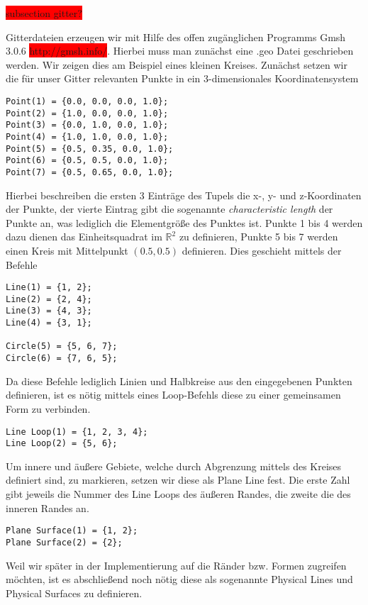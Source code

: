 \documentclass[bibliography=totoc,12pt,a4paper]{scrartcl}
\theoremstyle{exampstyle}
\numberwithin{equation}{section}
\begin{document}
\colorbox{red}{subsection gitter?}

Gitterdateien erzeugen wir mit Hilfe des offen zugänglichen Programms \textsf{Gmsh 3.0.6} \colorbox{red}{http://gmsh.info/}. Hierbei muss man zunächst eine \textsf{.geo} Datei geschrieben werden. Wir zeigen dies am Beispiel eines kleinen Kreises.
Zunächst setzen wir die für unser Gitter relevanten Punkte in ein 3-dimensionales Koordinatensystem

\begin{lstlisting}
Point(1) = {0.0, 0.0, 0.0, 1.0};
Point(2) = {1.0, 0.0, 0.0, 1.0};
Point(3) = {0.0, 1.0, 0.0, 1.0};
Point(4) = {1.0, 1.0, 0.0, 1.0};
Point(5) = {0.5, 0.35, 0.0, 1.0};
Point(6) = {0.5, 0.5, 0.0, 1.0};
Point(7) = {0.5, 0.65, 0.0, 1.0};
\end{lstlisting}

Hierbei beschreiben die ersten 3 Einträge des Tupels die x-, y- und z-Koordinaten der Punkte, der vierte Eintrag gibt die sogenannte \textit{characteristic length} der Punkte an, was lediglich die Elementgröße des Punktes ist. Punkte 1 bis 4 werden dazu dienen das Einheitsquadrat im $\mathbb{R}^2$ zu definieren, Punkte 5 bis 7 werden einen Kreis mit Mittelpunkt $(0.5,0.5)$ definieren. Dies geschieht mittels der Befehle

\begin{lstlisting}
Line(1) = {1, 2};
Line(2) = {2, 4};
Line(3) = {4, 3};
Line(4) = {3, 1};

Circle(5) = {5, 6, 7};
Circle(6) = {7, 6, 5};
\end{lstlisting}

Da diese Befehle lediglich Linien und Halbkreise aus den eingegebenen Punkten definieren, ist es nötig mittels eines \textsf{Loop}-Befehls diese zu einer gemeinsamen Form zu verbinden.

\begin{lstlisting}
Line Loop(1) = {1, 2, 3, 4};
Line Loop(2) = {5, 6};
\end{lstlisting}

Um innere und äußere Gebiete, welche durch Abgrenzung mittels des Kreises definiert sind, zu markieren, setzen wir diese als \textsf{Plane Line} fest. Die erste Zahl gibt jeweils die Nummer des \textsf{Line Loops} des äußeren Randes, die zweite die des inneren Randes an.

\begin{lstlisting}
Plane Surface(1) = {1, 2};
Plane Surface(2) = {2};
\end{lstlisting}

Weil wir später in der Implementierung auf die Ränder bzw. Formen zugreifen möchten, ist es abschließend noch nötig diese als sogenannte \textsf{Physical Lines} und \textsf{Physical Surfaces} zu definieren. 
\end{document}
